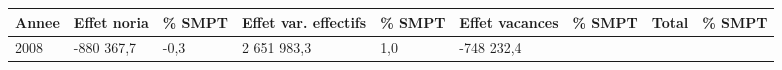 \begin{longtable}[]{@{}lllllllll@{}}
\toprule
\begin{minipage}[b]{0.05\columnwidth}\raggedright
Annee\strut
\end{minipage} & \begin{minipage}[b]{0.10\columnwidth}\raggedright
Effet noria\strut
\end{minipage} & \begin{minipage}[b]{0.06\columnwidth}\raggedright
\% SMPT\strut
\end{minipage} & \begin{minipage}[b]{0.16\columnwidth}\raggedright
Effet var. effectifs\strut
\end{minipage} & \begin{minipage}[b]{0.06\columnwidth}\raggedright
\% SMPT\strut
\end{minipage} & \begin{minipage}[b]{0.12\columnwidth}\raggedright
Effet vacances\strut
\end{minipage} & \begin{minipage}[b]{0.06\columnwidth}\raggedright
\% SMPT\strut
\end{minipage} & \begin{minipage}[b]{0.10\columnwidth}\raggedright
Total\strut
\end{minipage} & \begin{minipage}[b]{0.06\columnwidth}\raggedright
\% SMPT\strut
\end{minipage}\tabularnewline
\midrule
\endhead
\begin{minipage}[t]{0.05\columnwidth}\raggedright
2008\strut
\end{minipage} & \begin{minipage}[t]{0.10\columnwidth}\raggedright
-880 367,7\strut
\end{minipage} & \begin{minipage}[t]{0.06\columnwidth}\raggedright
-0,3\strut
\end{minipage} & \begin{minipage}[t]{0.16\columnwidth}\raggedright
2 651 983,3\strut
\end{minipage} & \begin{minipage}[t]{0.06\columnwidth}\raggedright
1,0\strut
\end{minipage} & \begin{minipage}[t]{0.12\columnwidth}\raggedright
-748 232,4\strut
\end{minipage} & \begin{minipage}[t]{0.06\columnwidth}\raggedright

\end{minipage}
\end{longtable}
